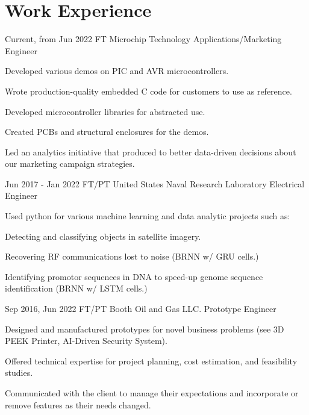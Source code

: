 \documentclass[
	10pt, %
]{FreemanCV}
\begin{document}
\section{Work Experience}





\jobentry
	{Current, from Jun 2022} %
	{FT} %
	{Microchip Technology} %
	{Applications/Marketing Engineer} %
	{ %
		\item Developed various demos on PIC and AVR microcontrollers.
		\item Wrote production-quality embedded C code for customers to use as reference.
		\item Developed microcontroller libraries for abstracted use.
		\item Created PCBs and structural enclosures for the demos.
		\item Led an analytics initiative that produced to better data-driven decisions about our marketing campaign strategies.
	} 


\jobentry
	{Jun 2017 - Jan 2022} %
	{FT/PT} %
	{United States Naval Research Laboratory} %
	{Electrical Engineer} %
	{ %
		\item Used python for various machine learning and data analytic projects such as:
		\item Detecting and classifying objects in satellite imagery.
		\item Recovering RF communications lost to noise (BRNN w/ GRU cells.)
		\item Identifying promotor sequences in DNA to speed-up genome sequence identification (BRNN w/ LSTM cells.)
	} 


\jobentry
	{Sep 2016, Jun 2022} %
	{FT/PT} %
	{Booth Oil and Gas LLC.} %
	{Prototype Engineer} %
	{ %
		\item Designed and manufactured prototypes for novel business problems (see 3D PEEK Printer, AI-Driven Security System).
		\item Offered technical expertise for project planning, cost estimation, and feasibility studies.
		\item Communicated with the client to manage their expectations and incorporate or remove features as their needs changed.
	}
	
\end{document}
